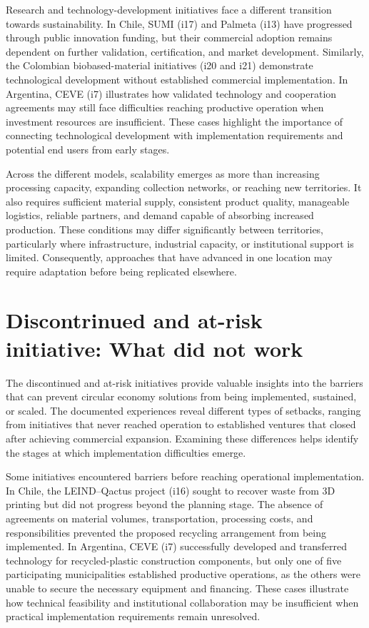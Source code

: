 \documentclass[
  12pt,
  oneside]{book}
\begin{document}
Research and technology-development initiatives face a different
transition towards sustainability. In Chile, SUMI (i17) and Palmeta
(i13) have progressed through public innovation funding, but their
commercial adoption remains dependent on further validation,
certification, and market development. Similarly, the Colombian
biobased-material initiatives (i20 and i21) demonstrate technological
development without established commercial implementation. In Argentina,
CEVE (i7) illustrates how validated technology and cooperation
agreements may still face difficulties reaching productive operation
when investment resources are insufficient. These cases highlight the
importance of connecting technological development with implementation
requirements and potential end users from early stages.

Across the different models, scalability emerges as more than increasing
processing capacity, expanding collection networks, or reaching new
territories. It also requires sufficient material supply, consistent
product quality, manageable logistics, reliable partners, and demand
capable of absorbing increased production. These conditions may differ
significantly between territories, particularly where infrastructure,
industrial capacity, or institutional support is limited. Consequently,
approaches that have advanced in one location may require adaptation
before being replicated elsewhere.

\section{Discontrinued and at-risk initiative: What did not
work}\label{discontrinued-and-at-risk-initiative-what-did-not-work}

The discontinued and at-risk initiatives provide valuable insights into
the barriers that can prevent circular economy solutions from being
implemented, sustained, or scaled. The documented experiences reveal
different types of setbacks, ranging from initiatives that never reached
operation to established ventures that closed after achieving commercial
expansion. Examining these differences helps identify the stages at
which implementation difficulties emerge.

Some initiatives encountered barriers before reaching operational
implementation. In Chile, the LEIND--Qactus project (i16) sought to
recover waste from 3D printing but did not progress beyond the planning
stage. The absence of agreements on material volumes, transportation,
processing costs, and responsibilities prevented the proposed recycling
arrangement from being implemented. In Argentina, CEVE (i7) successfully
developed and transferred technology for recycled-plastic construction
components, but only one of five participating municipalities
established productive operations, as the others were unable to secure
the necessary equipment and financing. These cases illustrate how
technical feasibility and institutional collaboration may be
insufficient when practical implementation requirements remain
unresolved.
\end{document}
